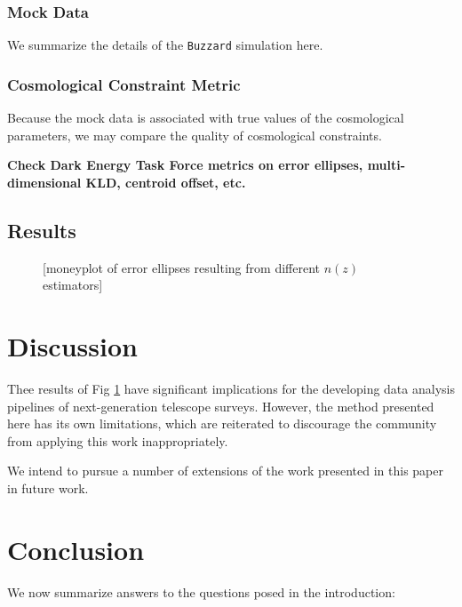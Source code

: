 \documentclass[iop]{emulateapj}
\begin{document}
\subsubsection{Mock Data}
\label{sec:buzzard}

We summarize the details of the \texttt{Buzzard} simulation here.

\subsubsection{Cosmological Constraint Metric}
\label{sec:cosmo}

Because the mock data is associated with true values of the cosmological parameters, we may compare the quality of cosmological constraints.

\textbf{Check Dark Energy Task Force metrics on error ellipses, multi-dimensional KLD, centroid offset, etc.}

\subsection{Results}
\label{sec:results}

\begin{figure}
	\begin{center}
		\caption{[moneyplot of error ellipses resulting from different $n(z)$ estimators]}
		\label{fig:money}
	\end{center}
\end{figure}

\section{Discussion}
\label{sec:discussion}

Thee results of Fig \ref{fig:money} have significant implications for the developing data analysis pipelines of next-generation telescope surveys.  However, the method presented here has its own limitations, which are reiterated to discourage the community from applying this work inappropriately.

We intend to pursue a number of extensions of the work presented in this paper in future work.

\section{Conclusion}
\label{sec:conclusion}

We now summarize answers to the questions posed in the introduction:
\end{document}
